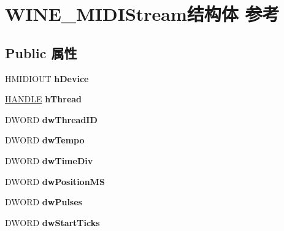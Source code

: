 \hypertarget{struct_w_i_n_e___m_i_d_i_stream}{}\section{W\+I\+N\+E\+\_\+\+M\+I\+D\+I\+Stream结构体 参考}
\label{struct_w_i_n_e___m_i_d_i_stream}
\subsection*{Public 属性}
\begin{DoxyCompactItemize}
\item 
\mbox{\label{struct_w_i_n_e___m_i_d_i_stream_ad06ac115c8cd5567b51b77deeb283a90}} 
H\+M\+I\+D\+I\+O\+UT {\bfseries h\+Device}
\item 
\mbox{\label{struct_w_i_n_e___m_i_d_i_stream_a63ff9a6ddc76a40662ff492cef7a40ad}} 
\hyperlink{interfacevoid}{H\+A\+N\+D\+LE} {\bfseries h\+Thread}
\item 
\mbox{\label{struct_w_i_n_e___m_i_d_i_stream_abb709637052bc393cb91825024b51f41}} 
D\+W\+O\+RD {\bfseries dw\+Thread\+ID}
\item 
\mbox{\label{struct_w_i_n_e___m_i_d_i_stream_abcf21d5d1593b8c324c4cbe762505d6d}} 
D\+W\+O\+RD {\bfseries dw\+Tempo}
\item 
\mbox{\label{struct_w_i_n_e___m_i_d_i_stream_ae6875617fd89aa5279af7adcb08b3b7a}} 
D\+W\+O\+RD {\bfseries dw\+Time\+Div}
\item 
\mbox{\label{struct_w_i_n_e___m_i_d_i_stream_ae926101dd4a6869a3647c477755c108b}} 
D\+W\+O\+RD {\bfseries dw\+Position\+MS}
\item 
\mbox{\label{struct_w_i_n_e___m_i_d_i_stream_a549b86f0ade6bd4ee0a5b9d2302b840d}} 
D\+W\+O\+RD {\bfseries dw\+Pulses}
\item 
\mbox{\label{struct_w_i_n_e___m_i_d_i_stream_a6e38503812f549040e62689858ecb844}} 
D\+W\+O\+RD {\bfseries dw\+Start\+Ticks}

\end{DoxyCompactItemize}
